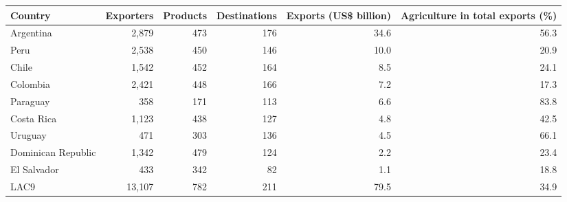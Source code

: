 \begin{tabular}{lrrrrr}
\toprule
Country & Exporters & Products & Destinations & Exports (US\$ billion) & Agriculture in total exports (\%) \\
\midrule
Argentina & 2,879 & 473 & 176 & 34.6 & 56.3 \\
Peru & 2,538 & 450 & 146 & 10.0 & 20.9 \\
Chile & 1,542 & 452 & 164 & 8.5 & 24.1 \\
Colombia & 2,421 & 448 & 166 & 7.2 & 17.3 \\
Paraguay & 358 & 171 & 113 & 6.6 & 83.8 \\
Costa Rica & 1,123 & 438 & 127 & 4.8 & 42.5 \\
Uruguay & 471 & 303 & 136 & 4.5 & 66.1 \\
Dominican Republic & 1,342 & 479 & 124 & 2.2 & 23.4 \\
El Salvador & 433 & 342 & 82 & 1.1 & 18.8 \\
\midrule
LAC9 & 13,107 & 782 & 211 & 79.5 & 34.9 \\
\bottomrule
\end{tabular}
